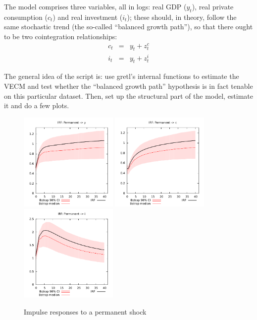 \documentclass[a4paper,10pt]{article}
\newcommand{\app}[1]{\textsf{#1}}
\newcounter{script}[section]
\begin{document}
The model comprises three variables, all in logs: real GDP ($y_t$),
real private consumption ($c_t$) and real investment ($i_t$); these
should, in theory, follow the same stochastic trend (the so-called
``balanced growth path''), so that there ought to be two cointegration
relationships:
\begin{eqnarray*}
  c_t &=& y_t + z^c_t \\
  i_t &=& y_t + z^i_t
\end{eqnarray*}

The general idea of the script is: use \app{gretl}'s internal
functions to estimate the VECM and test whether the ``balanced growth
path'' hypothesis is in fact tenable on this particular dataset. Then,
set up the structural part of the model, estimate it and do a few
plots.

\begin{figure}[htbp]
  \centering
  \includegraphics[height=4.75cm]{awm-irfy}
  \includegraphics[height=4.75cm]{awm-irfc}
  \includegraphics[height=4.75cm]{awm-irfi}
  \caption{Impulse responses to a permanent shock}
  \label{fig:AWM-irfs}
\end{figure}
\end{document}
